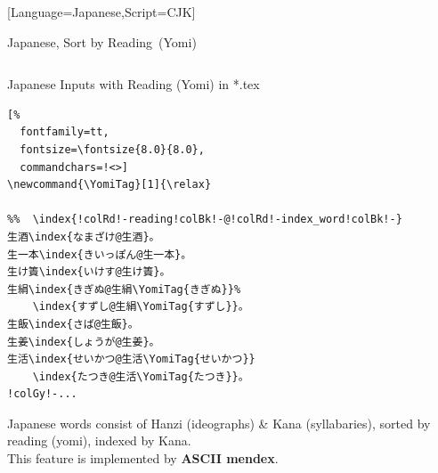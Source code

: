 \documentclass[aspectratio=169,10pt]{beamer}
\begin{document}
\setmonofont{Noto Sans Mono CJK JP}[Language=Japanese,Script=CJK]
\begin{frame}[fragile]{Japanese, Sort by Reading~{\normalsize (Yomi)}}

\begin{columns}
\begin{column}{75mm}
\begin{exampleblock}{Japanese Inputs with Reading {\footnotesize(Yomi)} in *.tex}
\begin{Verbatim}[%
  fontfamily=tt,
  fontsize=\fontsize{8.0}{8.0},
  commandchars=!<>]
\newcommand{\YomiTag}[1]{\relax}

%%  \index{!colRd!-reading!colBk!-@!colRd!-index_word!colBk!-}
生酒\index{なまざけ@生酒}。
生一本\index{きいっぽん@生一本}。
生け簀\index{いけす@生け簀}。
生絹\index{きぎぬ@生絹\YomiTag{きぎぬ}}%
    \index{すずし@生絹\YomiTag{すずし}}。
生飯\index{さば@生飯}。
生姜\index{しょうが@生姜}。
生活\index{せいかつ@生活\YomiTag{せいかつ}}
    \index{たつき@生活\YomiTag{たつき}}。
!colGy!-...
\end{Verbatim}
\end{exampleblock}
{\footnotesize
Japanese words consist of Hanzi (ideographs) \& Kana (syllabaries),
sorted by reading (yomi), indexed by Kana.\\[1.0ex]
This feature is implemented by \textbf{ASCII mendex}.}
\end{column}

\begin{column}{60mm}
\vspace{-2mm}
\begin{center}
%
\end{center}
\end{column}
\end{columns}

\end{frame}

\end{document}
